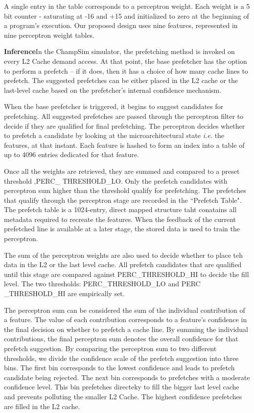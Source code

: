 A single entry in the table corresponds to a perceptron weight.  Each
weight is a 5 bit counter - saturating at -16 and +15 and initialized
to zero at the beginning of a program's execution. Our proposed design
uses nine features, represented in nine perceptron weight tables.

\textbf{Inference}\newline In the ChampSim simulator, the prefetching
method is invoked on every L2 Cache demand access.  At that point, the
base prefetcher has the option to perform a prefetch -- if it does,
then it has a choice of how many cache lines to prefetch.  The
suggested prefetches can be either placed in the L2 cache or the
last-level cache based on the prefetcher's internal confidence
mechanism.

When the base prefetcher is triggered, it begins to suggest candidates
for prefetching. All suggested prefetches are passed through the
perceptron filter to decide if they are qualified for final
prefetching.  The perceptron decides whether to prefetch a candidate
by looking at the microarchitectural state \textit{i.e.} the features,
at that instant. Each feature is hashed to form an index into a table
of up to 4096 entries dedicated for that feature.

Once all the weights are retrieved, they are summed and compared to a
preset threshold ,PERC\_ THRESHOLD\_LO.  Only the prefetch candidates
with perceptron sum higher than the threshold qualify for prefetching.
The prefetches that qualify through the perceptron stage are recorded
in the ``Prefetch Table". The prefetch table is a 1024-entry, direct
mapped structure taht conatains all metadata required to recreate the
features.  %
When the feedback of the current prefetched line is available at a
later stage, the stored data is used to train the perceptron.

The sum of the perceptron weights are also used to decide whether to
place teh data in the L2 or the last level cache. All prefetch
candidates that are qualified until this stage are compared against
PERC\_THRESHOLD\_HI to decide the fill level. The two thresholds:
PERC\_THRESHOLD\_LO and PERC \_THRESHOLD\_HI are empirically set.

The perceptron sum can be considered the sum of the individual
contribution of a feature.  The value of each contribution corresponds
to a feature's confidence in the final decision on whether to prefetch
a cache line. By summing the individual contributions, the final
perceptron sum denotes the overall confidence for that prefetch
suggestion.  By comparing the perceptron sum to two different
thresholds, we divide the confidence scale of the prefetch suggestion
into three bins. The first bin corresponds to the lowest confidence
and leads to prefetch candidate being rejected.  The next bin
corresponds to prefetches with a moderate confidence level.  This bin
prefetches directeky to fill the bigger last level cache and prevents
polluting the smaller L2 Cache.  The highest confidence prefetches are
filled in the L2 cache.

